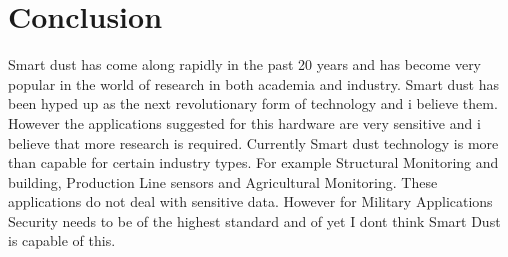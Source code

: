 \documentclass[article]{IEEEtran}
\begin{document}
\section{Conclusion}
Smart dust has come along rapidly in the past 20 years and has become very popular in the world of research in both academia and industry. Smart dust has been hyped up as the next revolutionary form of technology and i believe them. However the applications suggested for this hardware are very sensitive and i believe that more research is required. Currently Smart dust technology is more than capable for certain industry types. For example Structural Monitoring and building, Production Line sensors and Agricultural Monitoring. These applications do not deal with sensitive data. However for Military Applications Security needs to be of the highest standard and of yet I dont think Smart Dust is capable of this. 
\listoffigures
\printbibliography
\end{document}

